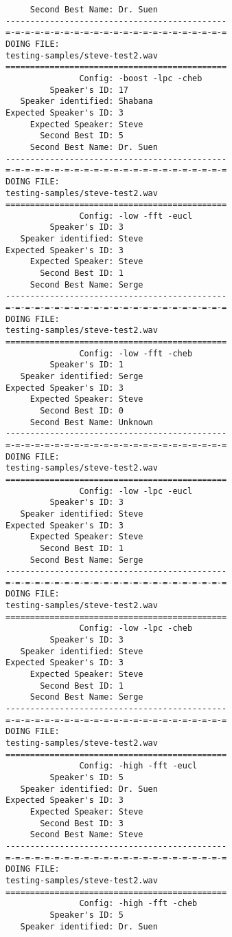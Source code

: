 \begin{verbatim}
     Second Best Name: Dr. Suen
---------------------------------------------
=-=-=-=-=-=-=-=-=-=-=-=-=-=-=-=-=-=-=-=-=-=-=
DOING FILE:
testing-samples/steve-test2.wav
=============================================
               Config: -boost -lpc -cheb
         Speaker's ID: 17
   Speaker identified: Shabana
Expected Speaker's ID: 3
     Expected Speaker: Steve
       Second Best ID: 5
     Second Best Name: Dr. Suen
---------------------------------------------
=-=-=-=-=-=-=-=-=-=-=-=-=-=-=-=-=-=-=-=-=-=-=
DOING FILE:
testing-samples/steve-test2.wav
=============================================
               Config: -low -fft -eucl
         Speaker's ID: 3
   Speaker identified: Steve
Expected Speaker's ID: 3
     Expected Speaker: Steve
       Second Best ID: 1
     Second Best Name: Serge
---------------------------------------------
=-=-=-=-=-=-=-=-=-=-=-=-=-=-=-=-=-=-=-=-=-=-=
DOING FILE:
testing-samples/steve-test2.wav
=============================================
               Config: -low -fft -cheb
         Speaker's ID: 1
   Speaker identified: Serge
Expected Speaker's ID: 3
     Expected Speaker: Steve
       Second Best ID: 0
     Second Best Name: Unknown
---------------------------------------------
=-=-=-=-=-=-=-=-=-=-=-=-=-=-=-=-=-=-=-=-=-=-=
DOING FILE:
testing-samples/steve-test2.wav
=============================================
               Config: -low -lpc -eucl
         Speaker's ID: 3
   Speaker identified: Steve
Expected Speaker's ID: 3
     Expected Speaker: Steve
       Second Best ID: 1
     Second Best Name: Serge
---------------------------------------------
=-=-=-=-=-=-=-=-=-=-=-=-=-=-=-=-=-=-=-=-=-=-=
DOING FILE:
testing-samples/steve-test2.wav
=============================================
               Config: -low -lpc -cheb
         Speaker's ID: 3
   Speaker identified: Steve
Expected Speaker's ID: 3
     Expected Speaker: Steve
       Second Best ID: 1
     Second Best Name: Serge
---------------------------------------------
=-=-=-=-=-=-=-=-=-=-=-=-=-=-=-=-=-=-=-=-=-=-=
DOING FILE:
testing-samples/steve-test2.wav
=============================================
               Config: -high -fft -eucl
         Speaker's ID: 5
   Speaker identified: Dr. Suen
Expected Speaker's ID: 3
     Expected Speaker: Steve
       Second Best ID: 3
     Second Best Name: Steve
---------------------------------------------
=-=-=-=-=-=-=-=-=-=-=-=-=-=-=-=-=-=-=-=-=-=-=
DOING FILE:
testing-samples/steve-test2.wav
=============================================
               Config: -high -fft -cheb
         Speaker's ID: 5
   Speaker identified: Dr. Suen

\end{verbatim}
